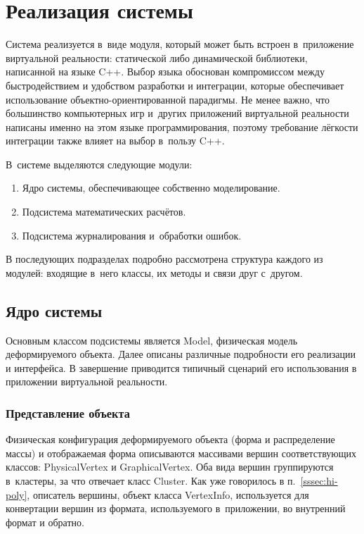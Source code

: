 \documentclass[a4paper, 14pt, titlepage]{extarticle}
\let\oldsection\section
\renewcommand{\section}{\newpage\oldsection}
\begin{document}
  \section{Реализация системы}

    Система реализуется в~виде модуля, который может быть встроен в~приложение виртуальной
    реальности: статической либо динамической библиотеки, написанной на языке C++. Выбор языка
    обоснован компромиссом между быстродействием и удобством разработки и интеграции, которые
    обеспечивает использование объектно-ориентированной парадигмы. Не менее важно, что большинство
    компьютерных игр и~других приложений виртуальной реальности написаны именно на этом языке
    программирования, поэтому требование лёгкости интеграции также влияет на выбор в~пользу C++.

    В~системе выделяются следующие модули:
    \begin{enumerate}
      \item Ядро системы, обеспечивающее собственно моделирование.
      \item Подсистема математических расчётов.
      \item Подсистема журналирования и~обработки ошибок.
    \end{enumerate}

    В последующих подразделах подробно рассмотрена структура каждого из модулей: входящие в~него
    классы, их методы и связи друг с~другом.

    \subsection{Ядро системы}

      Основным классом подсистемы является Model, физическая модель деформируемого объекта.
      Далее описаны различные подробности его реализации и интерфейса. В завершение приводится
      типичный сценарий его использования в приложении виртуальной реальности.

      \subsubsection{Представление объекта}\label{sssec:representation}

        Физическая конфигурация деформируемого объекта (форма и распределение массы) и отображаемая форма описываются
        массивами вершин соответствующих классов: PhysicalVertex и GraphicalVertex. Оба вида вершин
        группируются в~кластеры, за что отвечает класс Cluster. Как уже говорилось в
        п.~\ref{sssec:hi-poly}, описатель вершины, объект класса VertexInfo, используется для
        конвертации вершин из формата, используемого в~приложении, во внутренний формат и обратно.
\end{document}
